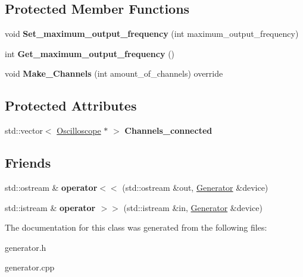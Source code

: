 \subsection*{Protected Member Functions}
\begin{DoxyCompactItemize}
\item 
\mbox{\label{class_generator_a49650ce5332daa24bcfe5e3f71d5d60d}} 
void {\bfseries Set\+\_\+maximum\+\_\+output\+\_\+frequency} (int maximum\+\_\+output\+\_\+frequency)
\item 
\mbox{\label{class_generator_a3be3fe5f3aa7c1bc8bb8884957f9aa0d}} 
int {\bfseries Get\+\_\+maximum\+\_\+output\+\_\+frequency} ()
\item 
\mbox{\label{class_generator_a8ed91c01c6b6b30804c5e5c327ef0eb4}} 
void {\bfseries Make\+\_\+\+Channels} (int amount\+\_\+of\+\_\+channels) override
\end{DoxyCompactItemize}
\subsection*{Protected Attributes}
\begin{DoxyCompactItemize}
\item 
\mbox{\label{class_generator_a76b2aaa59079a19603f9084c3ae114d6}} 
std\+::vector$<$ \mbox{\hyperlink{class_oscilloscope}{Oscilloscope}} $\ast$ $>$ {\bfseries Channels\+\_\+connected}
\end{DoxyCompactItemize}
\subsection*{Friends}
\begin{DoxyCompactItemize}
\item 
\mbox{\label{class_generator_a93e2edbdcad1073f5d479d4aa2795f8f}} 
std\+::ostream \& {\bfseries operator$<$$<$} (std\+::ostream \&out, \mbox{\hyperlink{class_generator}{Generator}} \&device)
\item 
\mbox{\label{class_generator_a38a26b6eb95f1a965f2277acd9a02a62}} 
std\+::istream \& {\bfseries operator $>$$>$} (std\+::istream \&in, \mbox{\hyperlink{class_generator}{Generator}} \&device)
\end{DoxyCompactItemize}


The documentation for this class was generated from the following files\+:\begin{DoxyCompactItemize}
\item 
generator.\+h\item 
generator.\+cpp\end{DoxyCompactItemize}

